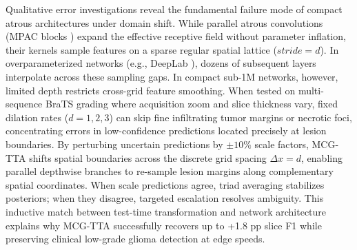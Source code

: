 Qualitative error investigations reveal the fundamental failure mode of compact atrous architectures under domain shift. While parallel atrous convolutions (MPAC blocks \cite{16}) expand the effective receptive field without parameter inflation, their kernels sample features on a sparse regular spatial lattice ($stride = d$). In overparameterized networks (e.g., DeepLab \cite{5}), dozens of subsequent layers interpolate across these sampling gaps. In compact sub-1M networks, however, limited depth restricts cross-grid feature smoothing. When tested on multi-sequence BraTS grading where acquisition zoom and slice thickness vary, fixed dilation rates ($d=1, 2, 3$) can skip fine infiltrating tumor margins or necrotic foci, concentrating errors in low-confidence predictions located precisely at lesion boundaries. By perturbing uncertain predictions by $\pm 10\%$ scale factors, MCG-TTA shifts spatial boundaries across the discrete grid spacing $\Delta x = d$, enabling parallel depthwise branches to re-sample lesion margins along complementary spatial coordinates. When scale predictions agree, triad averaging stabilizes posteriors; when they disagree, targeted escalation resolves ambiguity. This inductive match between test-time transformation and network architecture explains why MCG-TTA successfully recovers up to +1.8 pp slice F1 while preserving clinical low-grade glioma detection at edge speeds.
